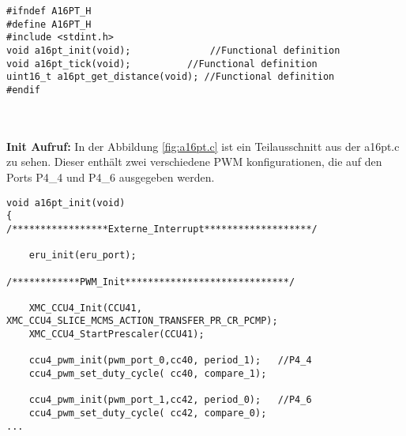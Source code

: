 \begin{minipage}{1\textwidth}
\begin{lstlisting}
#ifndef A16PT_H
#define A16PT_H
#include <stdint.h>
void a16pt_init(void);				//Functional definition
void a16pt_tick(void); 			//Functional definition
uint16_t a16pt_get_distance(void); //Functional definition
#endif
\end{lstlisting}
\label{fig:a16pt.h}
\end{minipage}\\
\\
\textbf{Init Aufruf:}
In der Abbildung \ref{fig:a16pt.c} ist ein Teilausschnitt aus der a16pt.c zu sehen. Dieser enthält zwei verschiedene PWM konfigurationen, die auf den Ports P4\_4 und P4\_6 ausgegeben werden.

\begin{minipage}{1\textwidth}
\begin{lstlisting}
void a16pt_init(void)
{
/*****************Externe_Interrupt*******************/

	eru_init(eru_port);

/************PWM_Init*****************************/

	XMC_CCU4_Init(CCU41, XMC_CCU4_SLICE_MCMS_ACTION_TRANSFER_PR_CR_PCMP);
	XMC_CCU4_StartPrescaler(CCU41);

	ccu4_pwm_init(pwm_port_0,cc40, period_1);	//P4_4
	ccu4_pwm_set_duty_cycle( cc40, compare_1);

	ccu4_pwm_init(pwm_port_1,cc42, period_0);	//P4_6
	ccu4_pwm_set_duty_cycle( cc42, compare_0);
...
\end{lstlisting}
\label{fig:a16pt.c}
\end{minipage}



